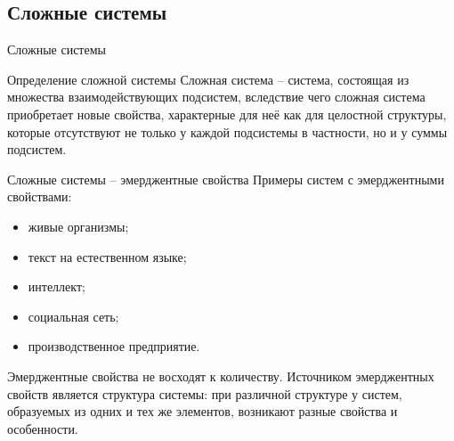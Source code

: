 \documentclass{beamer}
\begin{document}
\begin{darkframes}

		\subsection{Сложные системы}
		\begin{frame}{Сложные системы}
			\begin{block}{Определение сложной системы}
			\centering
				Сложная система -- система, состоящая из множества взаимодействующих подсистем, вследствие чего сложная система приобретает новые свойства, характерные для неё как для целостной структуры, которые отсутствуют не только у каждой подсистемы в частности, но и у суммы подсистем.
			\end{block}
		\end{frame}

		\begin{frame}[label=math]{Сложные системы -- эмерджентные свойства}
		\centering
			Примеры систем с эмерджентными свойствами:
			\begin{itemize}
				\item живые организмы;
				\item текст на естественном языке;
				\item интеллект;
				\item социальная сеть;
				\item производственное предприятие.
			\end{itemize}



			Эмерджентные свойства \alert{не восходят к количеству}.
			Источником эмерджентных свойств является структура системы: при различной структуре у систем, образуемых из одних и тех же элементов, возникают разные свойства и особенности.


\end{frame}
\end{darkframes}
\end{document}
